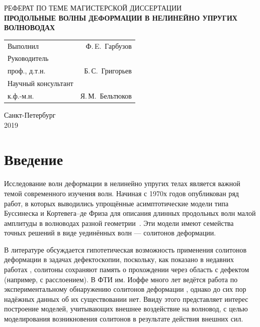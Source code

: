 \documentclass[12pt, a4paper]{article}
\begin{document}
\begin{titlepage}
	
	\begin{center}
		\vspace*{80mm}
		{РЕФЕРАТ ПО ТЕМЕ МАГИСТЕРСКОЙ ДИССЕРТАЦИИ}\\
		\vspace{5mm} 
		{\bf ПРОДОЛЬНЫЕ ВОЛНЫ ДЕФОРМАЦИИ В НЕЛИНЕЙНО УПРУГИХ ВОЛНОВОДАХ}
	\end{center}

	\vspace{30mm}
	\begin{flushleft}
	\begin{tabularx}{\linewidth}{Xr}
		Выполнил & Ф.\,E.~Гарбузов  \\ 
		\vspace{3mm}
		Руководитель &  \\ 
		проф., д.т.н. & Б.\,С.~Григорьев \\ 
		\vspace{3mm}
		Научный консультант  &  \\ 
		к.ф.-м.н. & Я.\,М.~Бельтюков
	\end{tabularx} 
	\end{flushleft}

	
	\vspace{50mm}
	
	\begin{center}
		Санкт-Петербург\\2019
	\end{center}
	
\end{titlepage}



\section{Введение}
\setcounter{page}{2}

Исследование волн деформации в нелинейно упругих телах
является важной темой современного изучения волн.
Начиная с 1970х годов опубликован ряд работ, в которых выводились упрощённые асимптотические модели типа Буссинеска и Кортевега--де Фриза для описания длинных продольных волн малой амплитуды в волноводах разной геометрии~\cite{OS, NS, S_book, P_book, SP, DC, DF, KSZ}. Эти модели имеют семейства точных решений в виде уединённых волн --- солитонов деформации.

В литературе обсуждается гипотетическая возможность применения солитонов деформации в задачах дефектоскопии, поскольку, как показано в недавних работах \cite{KS, KT1, KT2}, солитоны сохраняют память о прохождении через область с дефектом (например, с расслоением). В ФТИ им. Иоффе много лет ведётся работа по экспериментальному обнаружению солитонов деформации \cite{JAP2010, JAP2012}, однако до сих пор надёжных данных об их существовании нет. Ввиду этого представляет интерес построение моделей, учитывающих внешнее воздействие на волновод, с целью моделирования возникновения солитонов в результате действия внешних сил. 
\end{document}
